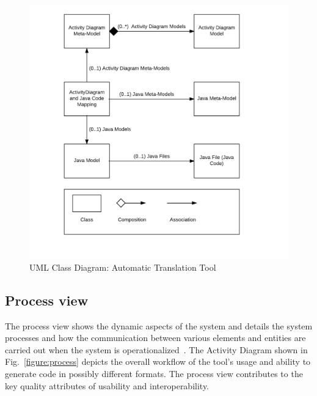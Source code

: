 \begin{figure}[!ht]
	\includegraphics[width=\textwidth]{figs/Logical_View}
	\caption{UML Class Diagram: Automatic Translation Tool}
	\label{fig:class}
\end{figure}





\subsection{Process view}
The process view shows the dynamic aspects of the system and details the system processes and how the communication between various elements and entities are carried out when the system is operationalized~\cite{kruchten19954+}. The Activity Diagram shown in Fig.~\ref{figure:process} depicts the overall workflow of the tool's usage and ability to generate code in possibly different formats. The process view contributes to the key quality attributes of usability and interoperability.  

